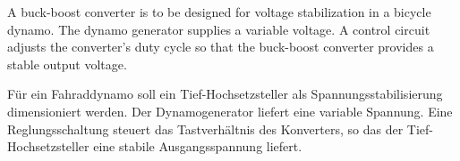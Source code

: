 


A buck-boost converter is to be designed for voltage stabilization in a bicycle dynamo.
The dynamo generator supplies a variable voltage. A control circuit adjusts the converter's duty cycle
so that the buck-boost converter provides a stable output voltage.

\begin{germanblock}
    Für ein Fahraddynamo soll ein Tief-Hochsetzsteller als Spannungsstabilisierung dimensioniert werden.
    Der Dynamogenerator liefert eine variable Spannung. Eine Reglungsschaltung steuert das Tastverhältnis des Konverters,
    so das der Tief-Hochsetzsteller eine stabile Ausgangsspannung liefert.
\end{germanblock}





